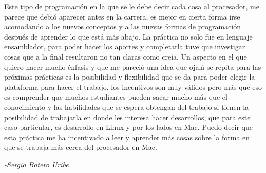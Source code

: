 
%
%
%

%


Este tipo de programación en la que se le debe decir cada cosa al procesador, me parece que debió aparecer antes en la carrera, es mejor en cierta forma irse acomodando a los nuevos conceptos y a las nuevas formas de programación después de aprender lo que está más abajo.
La práctica no solo fue en lenguaje ensamblador, para poder hacer los aportes y completarla tuve que investigar cosas que a la final resultaron no tan claras como creía.
Un aspecto en el que quiero hacer mucho énfasis y que me pareció una idea que ojalá se repita para las próximas prácticas es la posibilidad y flexibilidad que se da para poder elegir la plataforma para hacer el trabajo, los incentivos son muy válidos pero más que eso es comprender que muchos estudiantes pueden sacar mucho más que el conocimiento y las habilidades que se espera obtengan del trabajo si tienen la posibilidad de trabajarla en donde les interesa hacer desarrollos, que para este caso particular, es desarrollo en Linux y por los lados en Mac. Puedo decir que esta práctica me ha incentivado a leer y aprender más cosas sobre la forma en que se trabaja más cerca del procesador en Mac.

\begin{flushright} 
	\itshape{-Sergio Botero Uribe}
\end{flushright}

%
